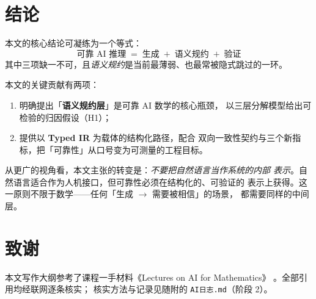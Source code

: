 \documentclass[UTF8,a4paper,11pt]{ctexart}
\newcommand{\code}[1]{\texttt{#1}}
\begin{document}
\section{结论}\label{sec:conclusion}

本文的核心结论可凝练为一个等式：
\begin{equation}\label{eq:conclusion}
  \boxed{\ \text{可靠 AI 推理} \;=\; \text{生成} \;+\; \text{语义规约} \;+\; \text{验证}\ }
\end{equation}
其中三项缺一不可，且\emph{语义规约}是当前最薄弱、也最常被隐式跳过的一环。

本文的关键贡献有两项：
\begin{enumerate}[leftmargin=1.6em,itemsep=2pt]
  \item 明确提出「\textbf{语义规约层}」是可靠 AI 数学的核心瓶颈，
        以三层分解模型给出可检验的归因假设（H1）；
  \item 提供以 \textbf{Typed IR} 为载体的结构化路径，配合
        双向一致性契约与三个新指标，把「可靠性」从口号变为可测量的工程目标。
\end{enumerate}

从更广的视角看，本文主张的转变是：\emph{不要把自然语言当作系统的内部
表示}。自然语言适合作为人机接口，但可靠性必须在结构化的、可验证的
表示上获得。这一原则不限于数学——任何「生成 $\to$ 需要被相信」的场景，
都需要同样的中间层。

\section*{致谢}
本文写作大纲参考了课程一手材料《Lectures on AI for Mathematics》
\citep{chen2026lectures}。全部引用均经联网逐条核实；
核实方法与记录见随附的 \code{AI日志.md}（阶段 2）。


\end{document}
